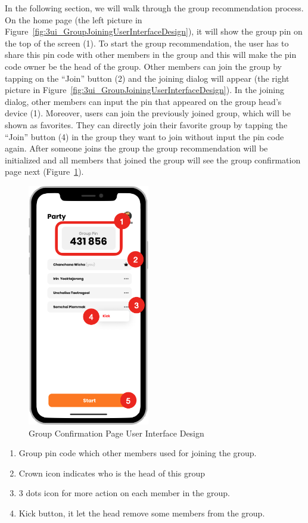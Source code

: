 \documentclass[12pt,oneside,openright,a4paper]{cpe-english-project}
\begin{document}
In the following section, we will walk through the group recommendation process. On the home page (the left picture in Figure~\ref{fig:3ui_GroupJoiningUserInterfaceDesign}), it will show the group pin on the top of the screen (1). To start the group recommendation, the user has to share this pin code with other members in the group and this will make the pin code owner be the head of the group. Other members can join the group by tapping on the “Join” button (2) and the joining dialog will appear (the right picture in Figure~\ref{fig:3ui_GroupJoiningUserInterfaceDesign}). In the joining dialog, other members can input the pin that appeared on the group head’s device (1). Moreover, users can join the previously joined group, which will be shown as favorites. They can directly join their favorite group by tapping the “Join” button (4) in the group they want to join without input the pin code again. After someone joins the group the group recommendation will be initialized and all members that joined the group will see the group confirmation page next (Figure~\ref{fig:3ui_GroupConfirmationPageUserInterfaceDesign}).

\newpage
\begin{figure}[H]\centering
\includegraphics[height=300pt]{./images/3ui_GroupConfirmationPageUserInterfaceDesign.png}
\caption{Group Confirmation Page User Interface Design}\label{fig:3ui_GroupConfirmationPageUserInterfaceDesign}
\end{figure}\vspace{-24pt}

\begin{enumerate}
\item Group pin code which other members used for joining the group.
\item Crown icon indicates who is the head of this group
\item 3 dots icon for more action on each member in the group.
\item Kick button, it let the head remove some members from the group.
\end{enumerate}
\end{document}
